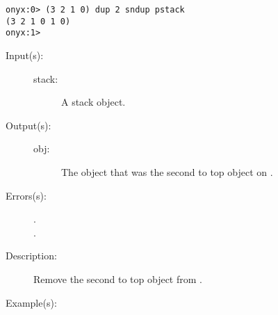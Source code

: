 \begin{description}
\begin{description}
\begin{verbatim}
onyx:0> (3 2 1 0) dup 2 sndup pstack
(3 2 1 0 1 0)
onyx:1>
		\end{verbatim}
	\end{description}
\label{systemdict:snip}
\item[{\onyxop{stack}{snip}{obj}}: ]
	\begin{description}\item[]
	\item[Input(s): ]
		\begin{description}\item[]
		\item[stack: ]
			A stack object.
		\end{description}
	\item[Output(s): ]
		\begin{description}\item[]
		\item[obj: ]
			The object that was the second to top object on
			.
		\end{description}
	\item[Errors(s): ]
		\begin{description}\item[]
		\item[.]
		\item[.]
		\end{description}
	\item[Description: ]
		Remove the second to top object from .
	\item[Example(s): ]\begin{verbatim}


\end{verbatim}
\end{description}
\end{description}
